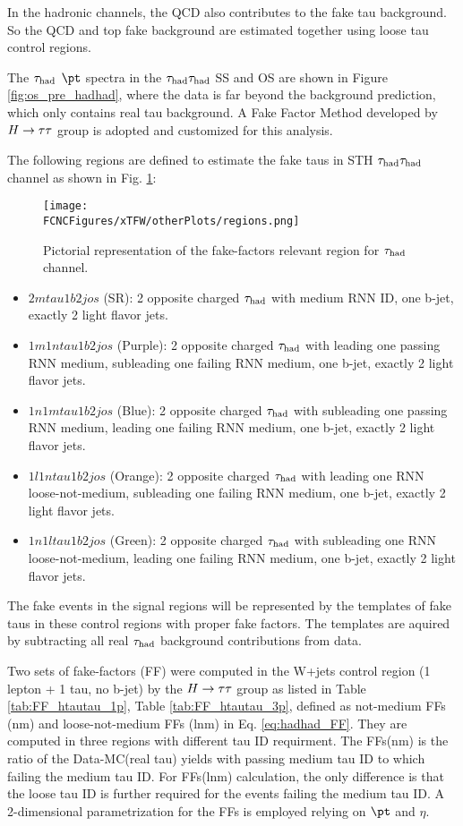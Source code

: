 In the hadronic channels, the QCD also contributes to the fake tau background. So the QCD and top fake background are estimated together using loose tau control regions.

The $\tau_\text{had}$ $\pt$ spectra in the $\tau_\text{had}{}\tau_\text{had}$ SS and OS are shown in Figure \ref{fig:os_pre_hadhad}, where the data is far beyond the background prediction, which only contains real tau background. A Fake Factor Method developed by $H \rightarrow \tau\tau$ group \cite{Htautau-note} is adopted and customized for this analysis. 

The following regions are defined to estimate the fake taus in STH $\tau_\text{had}{}\tau_\text{had}$ channel as shown in Fig. \ref{fig:regions_hadhad}:

\begin{figure}[htb]
\centering
\texttt{[image: \\FCNCFigures/xTFW/otherPlots/regions.png]}
\caption{Pictorial representation of the fake-factors relevant region for $\tau_\text{had}$ channel.}
\label{fig:regions_hadhad}
\end{figure}

\begin{itemize}
\item{$2mtau1b2jos$ (SR): 2 opposite charged $\tau_\text{had}$ with medium RNN ID, one b-jet, exactly 2 light flavor jets.}
\item{$1m1ntau1b2jos$ (Purple): 2 opposite charged $\tau_\text{had}$ with leading one passing RNN medium, subleading one failing RNN medium, one b-jet, exactly 2 light flavor jets.}
\item{$1n1mtau1b2jos$ (Blue): 2 opposite charged $\tau_\text{had}$ with subleading one passing RNN medium, leading one failing RNN medium, one b-jet, exactly 2 light flavor jets.}
\item{$1l1ntau1b2jos$ (Orange): 2 opposite charged $\tau_\text{had}$ with leading one RNN loose-not-medium, subleading one failing RNN medium, one b-jet, exactly 2 light flavor jets.}
\item{$1n1ltau1b2jos$ (Green): 2 opposite charged $\tau_\text{had}$ with subleading one RNN loose-not-medium, leading one failing RNN medium, one b-jet, exactly 2 light flavor jets.}
\end{itemize}

The fake events in the signal regions will be represented by the templates of fake taus in these control regions with proper fake factors. The templates are aquired by subtracting all real $\tau_\text{had}$ background contributions from data.

Two sets of fake-factors (FF) were computed in the W+jets control region (1 lepton + 1 tau, no b-jet) by the $H \rightarrow \tau\tau$ group \cite{Htautau-note} as listed in Table \ref{tab:FF_htautau_1p}, Table \ref{tab:FF_htautau_3p}, defined as not-medium FFs (nm) and loose-not-medium FFs (lnm) in Eq. \ref{eq:hadhad_FF}. They are computed in three regions with different tau ID requirment. The FFs(nm) is the ratio of the Data-MC(real tau) yields with passing medium tau ID to which failing the medium tau ID. For FFs(lnm) calculation, the only difference is that the loose tau ID is further required for the events failing the medium tau ID. A 2-dimensional parametrization for the FFs is employed relying on $\pt$ and $\eta$.


